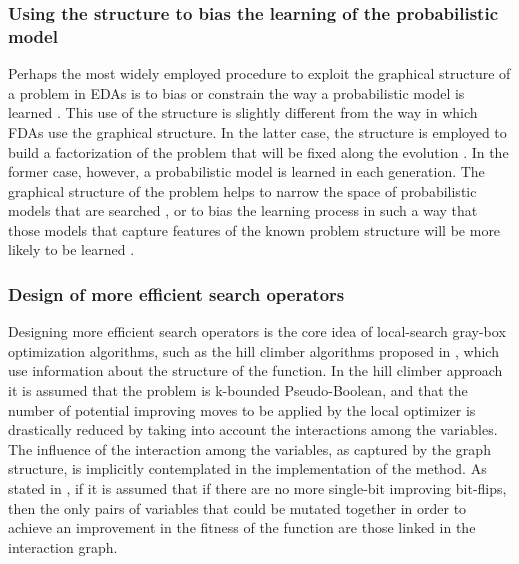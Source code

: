 \documentclass{article} %
\begin{document}
\subsubsection{Using the structure to bias the learning of the probabilistic model}

  Perhaps the most widely employed procedure to exploit the graphical structure of a problem in EDAs is to bias or constrain the way a probabilistic model is learned  \cite{Baluja:2006,Hauschild_et_al:2012,Santana:2005,Schwarz_and_Ocenasek:2000}. This use of the structure is slightly different from the way in which FDAs use the graphical structure. In the latter case, the structure is employed to build a factorization of the problem that will be fixed along the evolution \cite{Santana_et_al:1999}. In the former case, however, a probabilistic model is learned in each generation. The graphical structure of the problem helps to narrow the space of probabilistic models that are searched \cite{Baluja:2006,Muehlenbein_and_Mahnig:2002,Santana:2005}, or to bias the learning process in such a way that those models that capture features of the known problem structure will be more likely to be learned \cite{Hauschild_et_al:2012,Pelikan_et_al:2011,Schwarz_and_Ocenasek:2000}. 





\subsubsection{Design of more efficient search operators}

  Designing more efficient search operators is the core idea of local-search gray-box optimization algorithms, such as the hill climber algorithms proposed in \cite{Chicano_et_2014,Chicano_et_al:2016}, which use information about the structure of the function. In the hill climber approach it is assumed that the problem is k-bounded Pseudo-Boolean, and that the number of potential improving moves to be applied by the local optimizer is drastically reduced by taking into account the interactions among the variables. The influence of the interaction among the variables, as captured by the graph structure, is implicitly contemplated in the implementation of the method.  As stated in \cite{Whitley:2015}, if it is assumed that if there are no more single-bit improving bit-flips, then the only pairs of variables that could be mutated together in order to achieve an improvement in the fitness of the function are those linked in the interaction graph.
\end{document}
